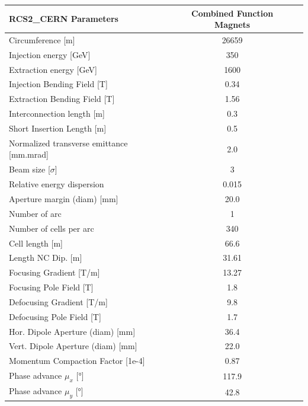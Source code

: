 \begin{tabular}{lcc}
\toprule
RCS2_CERN Parameters & Combined Function Magnets \\
\midrule
Circumference [m] & 26659 \\
Injection energy [GeV] & 350 \\
Extraction energy [GeV] & 1600 \\
Injection Bending Field [T] & 0.34 \\
Extraction Bending Field [T] & 1.56 \\
Interconnection length [m] & 0.3 \\
Short Insertion Length  [m] & 0.5 \\
Normalized transverse emittance [mm.mrad] & 2.0 \\
Beam size [$\sigma$] & 3 \\
Relative energy dispersion & 0.015 \\
Aperture margin (diam) [mm] & 20.0 \\
Number of arc & 1 \\
Number of cells per arc & 340 \\
Cell length [m] & 66.6 \\
Length NC Dip. [m] & 31.61 \\
Focusing Gradient [T/m] & 13.27 \\
Focusing Pole Field [T] & 1.8 \\
Defocusing Gradient [T/m] & 9.8 \\
Defocusing Pole Field [T] & 1.7 \\
Hor. Dipole Aperture (diam) [mm] & 36.4 \\
Vert. Dipole Aperture (diam) [mm] & 22.0 \\
Momentum Compaction Factor [1e-4] & 0.87 \\
Phase advance $\mu_x$ [°] & 117.9 \\
Phase advance $\mu_y$ [°] & 42.8 \\
\bottomrule
\end{tabular}
